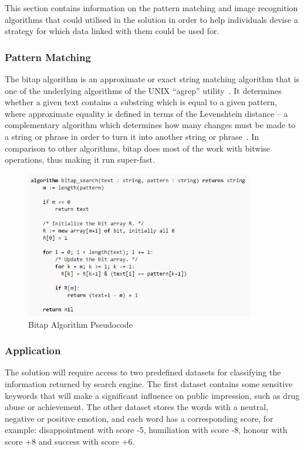   This section contains information on the pattern matching and image recognition algorithms that could utilised in the solution in order to help individuals devise a strategy for which data linked with them could be used for.

  \subsubsection{Pattern Matching}

    The bitap algorithm is an approximate or exact string matching algorithm that is one of the underlying algorithms of the UNIX ``agrep'' utility~\cite{}. It determines whether a given text contains a substring which is equal to a given pattern, where approximate equality is defined in terms of the Levenshtein distance – a complementary algorithm which determines how many changes must be made to a string or phrase in order to turn it into another string or phrase~\cite{}. In comparison to other algorithms, bitap does most of the work with bitwise operations, thus making it run super-fast.

    \begin{figure}
      \centering
      \begin{minipage}{10cm}
        \centering
        \includegraphics[width=10cm]{inc/bitap_algorithm.png}
        \caption{Bitap Algorithm Pseudocode}
        \label{fig:bitap_algorithm_pseudocode}
      \end{minipage}
    \end{figure}

  \subsubsection{Application}

    The solution will require access to two predefined datasets for classifying the information returned by search engine. The first dataset contains some sensitive keywords that will make a significant influence on public impression, such as drug abuse or achievement. The other dataset stores the words with a neutral, negative or positive emotion, and each word has a corresponding score, for example: disappointment with score -5, humiliation with score -8, honour with score +8 and success with score +6. 

